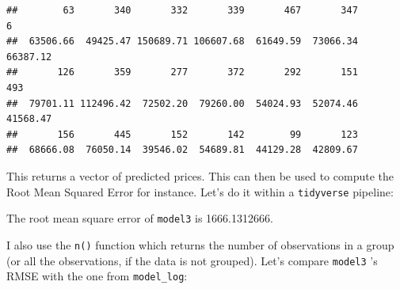 \documentclass[]{gitbook}
\newenvironment{Shaded}{\begin{snugshade}}{\end{snugshade}}
\newcommand{\DataTypeTok}[1]{\textcolor[rgb]{0.13,0.29,0.53}{#1}}
\newcommand{\DecValTok}[1]{\textcolor[rgb]{0.00,0.00,0.81}{#1}}
\newcommand{\KeywordTok}[1]{\textcolor[rgb]{0.13,0.29,0.53}{\textbf{#1}}}
\newcommand{\NormalTok}[1]{#1}
\newcommand{\OperatorTok}[1]{\textcolor[rgb]{0.81,0.36,0.00}{\textbf{#1}}}
\newcommand{\StringTok}[1]{\textcolor[rgb]{0.31,0.60,0.02}{#1}}
\theoremstyle{definition}
\theoremstyle{definition}
\theoremstyle{definition}
\theoremstyle{remark}
\begin{document}
\begin{verbatim}
##        63       340       332       339       467       347         6 
##  63506.66  49425.47 150689.71 106607.68  61649.59  73066.34  66387.12 
##       126       359       277       372       292       151       493 
##  79701.11 112496.42  72502.20  79260.00  54024.93  52074.46  41568.47 
##       156       445       152       142        99       123 
##  68666.08  76050.14  39546.02  54689.81  44129.28  42809.67
\end{verbatim}

This returns a vector of predicted prices. This can then be used to
compute the Root Mean Squared Error for instance. Let's do it within a
\texttt{tidyverse} pipeline:

\begin{Shaded}
\end{Shaded}

The root mean square error of \texttt{model3} is 1666.1312666.

I also use the \texttt{n()} function which returns the number of
observations in a group (or all the observations, if the data is not
grouped). Let's compare \texttt{model3} 's RMSE with the one from
\texttt{model\_log}:

\begin{Shaded}
\end{Shaded}
\end{document}
